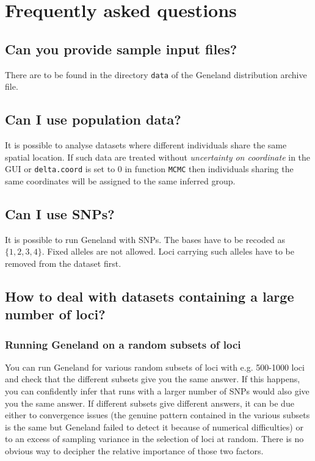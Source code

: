 \documentclass{article}
\begin{document}
\appendix
\clearpage
\section{Frequently asked questions}

\subsection{Can you provide sample input files?}
There are to be found in the directory {\tt data} of the Geneland distribution archive file.

\subsection{Can I use population data?}
It is possible to analyse datasets where different individuals share the same spatial location. 
If such data are treated without {\em uncertainty on coordinate } in the GUI or {\tt delta.coord} is set to 0 in function {\tt MCMC} 
then individuals sharing the same coordinates will be assigned to the same inferred group. 

\subsection{Can I use SNPs?}\label{sec:faq_SNPSs} 
It is possible to run {\sc Geneland} with SNPs. The bases have to be recoded as $\{1,2,3,4\}$.
Fixed alleles are not allowed. Loci carrying such alleles have to be removed from 
the dataset first. 

\subsection[Large number of loci]{How to deal with datasets containing a large number of loci?}
\subsubsection{Running {\sc Geneland} on a random subsets of loci}
You can run {\sc Geneland} for various random subsets of loci with e.g. 500-1000 loci and check that 
the different subsets give you the same answer. 
If this happens, you can confidently infer that runs with a larger number of SNPs would also give you the same answer. 
If different subsets give different answers, it can be due either to convergence issues (the genuine pattern contained in 
the various subsets is the same but {\sc Geneland} failed to detect it because of numerical difficulties) or 
to an excess of sampling variance in the selection of loci at random. There is no obvious way 
to decipher the relative importance of those two factors. 
\end{document}
